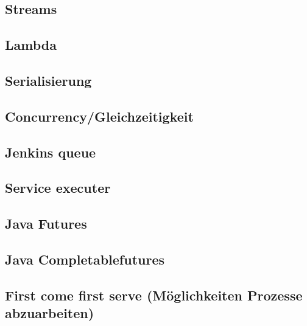 \subsection{Streams}
\subsection{Lambda}
\subsection{Serialisierung}
\subsection{Concurrency/Gleichzeitigkeit}
\subsection{Jenkins queue}
\subsection{Service executer}
\subsection{Java Futures}
\subsection{Java Completablefutures}
\subsection{First come first serve (Möglichkeiten Prozesse abzuarbeiten)}